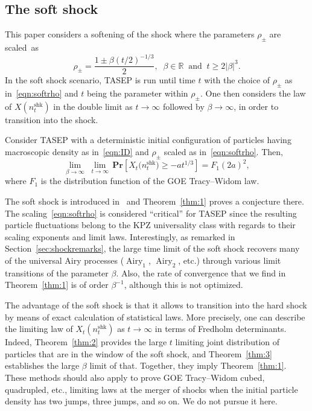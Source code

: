 \documentclass[AHL,Unicode,longabstracts]{cedram}
\DeclareMathOperator{\airy}{Airy}
\DeclareMathOperator{\shk}{shk}
\newcommand{\pr}[1]{\mathbf{Pr}\left[#1\right]}
\newcommand{\R}{\mathbb{R}}
\begin{document}
\subsection{The soft shock} This paper considers a softening of the shock where the parameters $\rho_{\pm}$ are scaled~as
\begin{equation}\label{eqn:softrho}
\rho_{\pm} = \frac{1 \pm \beta (t / 2)^{-1/3}}{2},\;\; \beta \in \R \;\;\text{and}\;\; t \geq 2|\beta|^{3}.
\end{equation}
In the soft shock scenario, TASEP is run until time $t$ with the choice of $\rho_{\pm}$ as in~\eqref{eqn:softrho} and $t$ being the parameter within $\rho_{\pm}$. One then considers the law of $X(n^{\shk}_t)$ in the double limit as $t \to \infty$ followed by $\beta \to \infty$, in order to transition into the shock.

\begin{theo} \label{thm:1}
Consider TASEP with a deterministic initial configuration of particles having macroscopic density as in~\eqref{eqn:ID} and $\rho_{\pm}$ scaled as in~\eqref{eqn:softrho}. Then,
\[
\lim_{\beta \to \infty}\; \lim_{t \to \infty}\, \pr{X_t \big(n^{\shk}_t \big) \geq - a t^{1/3}} = F_1(2a)^2,
\]
where $F_1$ is the distribution function of the GOE Tracy--Widom law.
\end{theo}

The soft shock is introduced in~\cite{FN2} and Theorem~\ref{thm:1} proves a conjecture there. The scaling~\eqref{eqn:softrho} is considered ``critical'' for TASEP since the resulting particle fluctuations belong to the KPZ universality class with regards to their scaling exponents and limit laws. Interestingly, as remarked in Section~\ref{sec:shockremarks}, the large time limit of the soft shock recovers many of the universal Airy processes ($\airy_1$, $\airy_2$, etc.) through various limit transitions of the parameter $\beta$. Also, the rate of convergence that we find in Theorem~\ref{thm:1} is of order $\beta^{-1}$, although this is not optimized.

The advantage of the soft shock is that it allows to transition into the hard shock by means of exact calculation of statistical laws. More precisely, one can describe the limiting law of $X_t(n^{\shk}_t)$ as $t \to \infty$ in terms of Fredholm determinants. Indeed, Theorem~\ref{thm:2} provides the large $t$ limiting joint distribution of particles that are in the window of the soft shock, and Theorem~\ref{thm:3} establishes the large $\beta$ limit of that. Together, they imply Theorem~\ref{thm:1}. These methods should also apply to prove GOE Tracy--Widom cubed, quadrupled, etc., limiting laws at the merger of shocks when the initial particle density has two jumps, three jumps, and so on. We do not pursue it here.
\end{document}
